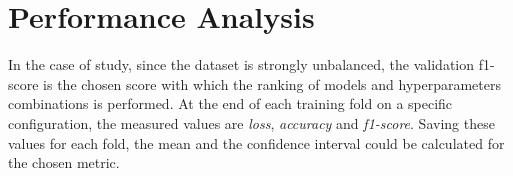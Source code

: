 \documentclass[../main]{subfiles}
\begin{document}
\section{Performance Analysis}
In the case of study, since the dataset is strongly unbalanced, the validation f1-score is the chosen score with which the ranking of models and hyperparameters combinations is performed.
At the end of each training fold on a specific configuration, the measured values are \textit{loss}, \textit{accuracy} and \textit{f1-score}.
Saving these values for each fold, the mean and the confidence interval could be calculated for the chosen metric.

\cleardoublepage
\end{document}

